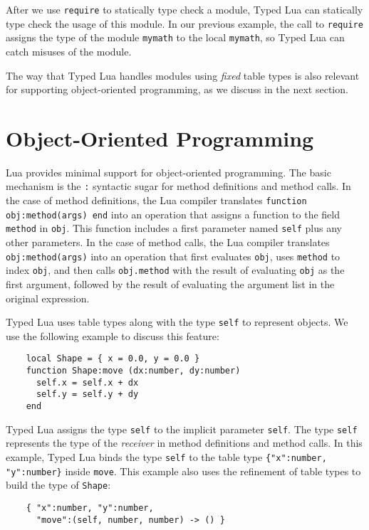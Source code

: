 After we use \texttt{require} to statically type check a module,
Typed Lua can statically type check the usage of this module.
In our previous example, the call to \texttt{require} assigns the type
of the module \texttt{mymath} to the local \texttt{mymath},
so Typed Lua can catch misuses of the module.

The way that Typed Lua handles modules using \emph{fixed} table types
is also relevant for supporting object-oriented programming,
as we discuss in the next section.

\section{Object-Oriented Programming}
\label{sec:oop}

Lua provides minimal support for object-oriented programming.
The basic mechanism is the \texttt{:} syntactic sugar for method
definitions and method calls.
In the case of method definitions, the Lua compiler translates
\texttt{function obj:method(args) end} into an operation that
assigns a function to the field \texttt{method} in \texttt{obj}.
This function includes a first parameter named \texttt{self} plus
any other parameters.
In the case of method calls, the Lua compiler translates
\texttt{obj:method(args)} into an operation that first evaluates
\texttt{obj}, uses \texttt{method} to index \texttt{obj},
and then calls \texttt{obj.method} with the result of evaluating
\texttt{obj} as the first argument, followed by the result of
evaluating the argument list in the original expression.

Typed Lua uses table types along with the type
\texttt{self} to represent objects.
We use the following example to discuss this feature:
\begin{verbatim}
    local Shape = { x = 0.0, y = 0.0 }
    function Shape:move (dx:number, dy:number)
      self.x = self.x + dx
      self.y = self.y + dy
    end
\end{verbatim}

Typed Lua assigns the type \texttt{self} to the implicit parameter \texttt{self}.
The type \texttt{self} represents the type of the \emph{receiver}
in method definitions and method calls.
In this example, Typed Lua binds the type \texttt{self} to
the table type \texttt{\{"x":number, "y":number\}} inside \texttt{move}.
This example also uses the refinement of table types to build the
type of \texttt{Shape}:
\begin{verbatim}
    { "x":number, "y":number,
      "move":(self, number, number) -> () }
\end{verbatim}


